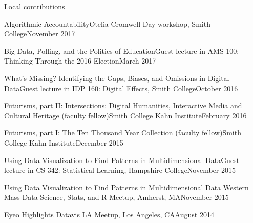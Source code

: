\documentclass{resume} %
\begin{document}
\begin{rSection}{Local contributions}

\begin{sSubsection}{Algorithmic Accountability}{}{}{Otelia Cromwell Day workshop, Smith College}{November 2017}
\end{sSubsection}

\begin{sSubsection}{Big Data, Polling, and the Politics of Education}{}{}{Guest lecture in AMS 100: Thinking Through the 2016 Election}{March 2017}
\end{sSubsection}

\begin{sSubsection}{What's Missing? Identifying the Gaps, Biases, and Omissions in Digital Data}{}{}{Guest lecture in IDP 160: Digital Effects, Smith College}{October 2016}
\end{sSubsection}

\begin{sSubsection}{Futurisms, part II: Intersections: Digital Humanities, Interactive Media and Cultural Heritage}{ (faculty fellow)}{}{Smith College Kahn Institute}{February 2016}
\end{sSubsection}
\begin{sSubsection}{Futurisms, part I: The Ten Thousand Year Collection}{ (faculty fellow)}{}{Smith College Kahn Institute}{December 2015}
\end{sSubsection}

\begin{sSubsection}{Using Data Visualization to Find Patterns in Multidimensional Data}{}{}{Guest lecture in CS 342: Statistical Learning, Hampshire College}{November 2015}
\end{sSubsection}

\begin{sSubsection}{Using Data Visualization to Find Patterns in Multidimensional Data}{ }{}{Western Mass Data Science, Stats, and R Meetup, Amherst, MA}{November 2015}
\end{sSubsection}



\begin{sSubsection}{Eyeo Highlights}{ }{}{Datavis LA Meetup, Los Angeles, CA}{August 2014}
\end{sSubsection}

\end{rSection}
\end{document}
